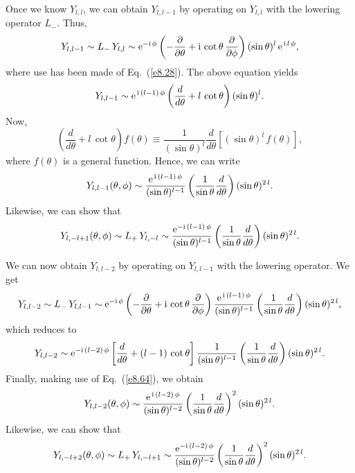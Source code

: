 Once we know $Y_{l,l}$, we can obtain $Y_{l,l-1}$ by operating
on $Y_{l,l}$ with the lowering operator $L_-$. Thus,
\begin{equation}
Y_{l,l-1} \sim L_-\,Y_{l,l} \sim {\rm e}^{-{\rm i}\,\phi}\left(-\frac{\partial}{\partial\theta} + {\rm i}\,\cot\theta\,\frac{\partial}{\partial\phi}\right) (\sin\theta)^l\,{\rm e}^{\,{\rm i}\,l\,\phi},
\end{equation}
where use has been made of Eq.~(\ref{e8.28}). 
The above equation yields
\begin{equation}
Y_{l,l-1}\sim {\rm e}^{\,{\rm i}\,(l-1)\,\phi}\left(\frac{d}{d\theta} +l\,\cot\theta\right)(\sin\theta)^l.
\end{equation}
Now,
\begin{equation}\label{e8.64}
\left(\frac{d}{d\theta}+l\,\cot\theta\right)f(\theta)\equiv
\frac{1}{(\sin\theta)^l}\frac{d}{d\theta}\left[
(\sin\theta)^l\,f(\theta)\right],
\end{equation}
where $f(\theta)$ is a general function. Hence, we can write
\begin{equation}\label{e8.64a}
Y_{l,l-1}(\theta,\phi)\sim \frac{{\rm e}^{\,{\rm i}\,(l-1)\,\phi}}{(\sin\theta)^{l-1}}\left(\frac{1}{\sin\theta}\frac{d}{d\theta}\right)
(\sin\theta)^{2\,l}.
\end{equation}
Likewise, we can show that
\begin{equation}\label{e8.65}
Y_{l,-l+1}(\theta,\phi)\sim L_+\,Y_{l,-l}\sim \frac{{\rm e}^{-{\rm i}\,(l-1)\,\phi}}{(\sin\theta)^{l-1}}\left(\frac{1}{\sin\theta}\frac{d}{d\theta}\right)
(\sin\theta)^{2\,l}.
\end{equation}

We can now obtain $Y_{l,l-2}$ by operating on $Y_{l,l-1}$ with the
lowering operator. We get
\begin{equation}
Y_{l,l-2}\sim L_-\,Y_{l,l-1}\sim {\rm e}^{-{\rm i}\,\phi}\left(-\frac{\partial}{\partial\theta} + {\rm i}\,\cot\theta\,\frac{\partial}{\partial\phi}\right) \frac{{\rm e}^{\,{\rm i}\,(l-1)\,\phi}}{(\sin\theta)^{l-1}}\left(\frac{1}{\sin\theta}\frac{d}{d\theta}\right)
(\sin\theta)^{2\,l},
\end{equation}
which reduces to
\begin{equation}
Y_{l,l-2}\sim {\rm e}^{-{\rm i}\,(l-2)\,\phi}\left[\frac{d}{d\theta} +(l-1)\,\cot\theta\right] \frac{1}{(\sin\theta)^{l-1}}\left(\frac{1}{\sin\theta}\frac{d}{d\theta}\right)
(\sin\theta)^{2\,l}.
\end{equation}
Finally, making use of Eq.~(\ref{e8.64}), we obtain
\begin{equation}\label{e8.68}
Y_{l,l-2}(\theta,\phi) \sim \frac{{\rm e}^{\,{\rm i}\,(l-2)\,\phi}}{(\sin\theta)^{l-2}}\left(\frac{1}{\sin\theta}\frac{d}{d\theta}\right)^2
(\sin\theta)^{2\,l}.
\end{equation}
Likewise, we can show that
\begin{equation}\label{e8.69}
Y_{l,-l+2}(\theta,\phi) \sim L_+\,Y_{l,-l+1}\sim \frac{{\rm e}^{-{\rm i}\,(l-2)\,\phi}}{(\sin\theta)^{l-2}}\left(\frac{1}{\sin\theta}\frac{d}{d\theta}\right)^2
(\sin\theta)^{2\,l}.
\end{equation}

